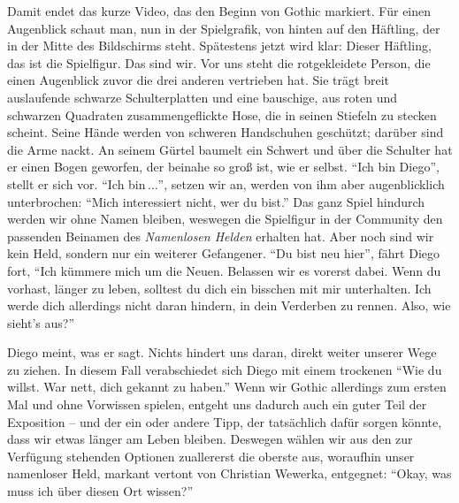 \documentclass[a5paper,pagesize,numbers=noenddot]{scrbook}
\begin{document}
Damit endet das kurze Video, das den Beginn von Gothic markiert.
Für einen Augenblick schaut man, nun in der Spielgrafik, von hinten auf den Häftling, der in der Mitte des Bildschirms steht.
Spätestens jetzt wird klar:
Dieser Häftling, das ist die Spielfigur.
Das sind wir.
Vor uns steht die rotgekleidete Person, die einen Augenblick zuvor die drei anderen vertrieben hat.
Sie trägt breit auslaufende schwarze Schulterplatten und eine bauschige, aus roten und schwarzen Quadraten zusammengeflickte Hose, die in seinen Stiefeln zu stecken scheint.
Seine Hände werden von schweren Handschuhen geschützt; darüber sind die Arme nackt.
An seinem Gürtel baumelt ein Schwert und über die Schulter hat er einen Bogen geworfen, der beinahe so groß ist, wie er selbst.
\enquote{Ich bin Diego}, stellt er sich vor.
\enquote{Ich bin\,$\ldots$}, setzen wir an, werden von ihm aber augenblicklich unterbrochen:
\enquote{Mich interessiert nicht, wer du bist.}
Das ganz Spiel hindurch werden wir ohne Namen bleiben, weswegen die Spielfigur in der Community den passenden Beinamen des \textit{Namenlosen Helden} erhalten hat.
Aber noch sind wir kein Held, sondern nur ein weiterer Gefangener.
\enquote{Du bist neu hier}, fährt Diego fort, \enquote{Ich kümmere mich um die Neuen.
Belassen wir es vorerst dabei.
Wenn du vorhast, länger zu leben, solltest du dich ein bisschen mit mir unterhalten.
Ich werde dich allerdings nicht daran hindern, in dein Verderben zu rennen.
Also, wie sieht's aus?}

Diego meint, was er sagt.
Nichts hindert uns daran, direkt weiter unserer Wege zu ziehen.
In diesem Fall verabschiedet sich Diego mit einem trockenen \enquote{Wie du willst.
War nett, dich gekannt zu haben.}
Wenn wir Gothic allerdings zum ersten Mal und ohne Vorwissen spielen, entgeht uns dadurch auch ein guter Teil der Exposition -- und der ein oder andere Tipp, der tatsächlich dafür sorgen könnte, dass wir etwas länger am Leben bleiben.
Deswegen wählen wir aus den zur Verfügung stehenden Optionen zuallererst die oberste aus, woraufhin unser namenloser Held, markant vertont von Christian Wewerka, entgegnet:
\enquote{Okay, was muss ich über diesen Ort wissen?}
\end{document}
